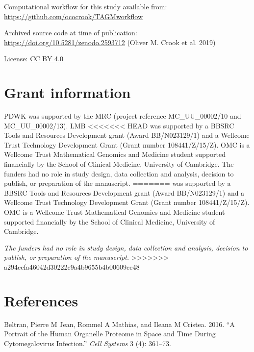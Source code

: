 \documentclass[
]{article}
\begin{document}
Computational workflow for this study available from:
\url{https://github.com/ococrook/TAGMworkflow}

Archived source code at time of publication:
\url{https://doi.org/10.5281/zenodo.2593712} (Oliver M. Crook et al.
2019)

License: \href{https://creativecommons.org/licenses/by/4.0/legalcode}{CC
BY 4.0}

\hypertarget{grant-information}{%
\section{Grant information}\label{grant-information}}

PDWK was supported by the MRC (project reference MC\_UU\_00002/10 and
MC\_UU\_00002/13). LMB
\textless\textless\textless\textless\textless\textless\textless{} HEAD
was supported by a BBSRC Tools and Resources Development grant (Award
BB/N023129/1) and a Wellcome Trust Technology Development Grant (Grant
number 108441/Z/15/Z). OMC is a Wellcome Trust Mathematical Genomics and
Medicine student supported financially by the School of Clinical
Medicine, University of Cambridge. The funders had no role in study
design, data collection and analysis, decision to publish, or
preparation of the manuscript. ======= was supported by a BBSRC Tools
and Resources Development grant (Award BB/N023129/1) and a Wellcome
Trust Technology Development Grant (Grant number 108441/Z/15/Z). OMC is
a Wellcome Trust Mathematical Genomics and Medicine student supported
financially by the School of Clinical Medicine, University of Cambridge.

\emph{The funders had no role in study design, data collection and
analysis, decision to publish, or preparation of the manuscript.}
\textgreater\textgreater\textgreater\textgreater\textgreater\textgreater\textgreater{}
a294ccfa46042d30222c9a4b9655b4b00609cc48

\hypertarget{references}{%
\section*{References}\label{references}}

\hypertarget{refs}{}
\leavevmode\hypertarget{ref-Beltran:2016}{}%
Beltran, Pierre M Jean, Rommel A Mathias, and Ileana M Cristea. 2016.
``A Portrait of the Human Organelle Proteome in Space and Time During
Cytomegalovirus Infection.'' \emph{Cell Systems} 3 (4): 361--73.
\end{document}
